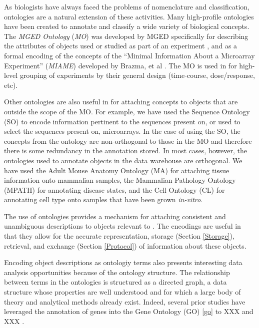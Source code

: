 As biologists have always faced the problems of nomenclature and
classification, ontologies are a natural extension of these activities.  Many
high-profile ontologies have been created to annotate and classify a wide
variety of biological concepts.  The \emph{MGED Ontology} (\emph{MO}) was
developed by MGED specifically for describing the attributes of objects used or
studied as part of an experiment \cite{XXX}, and as a formal encoding of the
concepts of the ``Minimal Information About a Microarray Experiment''
(\emph{MIAME}) developed by Brazma, et al \cite{brazma2001mim}.  The MO is used
in \dbthesis for high-level grouping of experiments by their general design
(time-course, dose/response, etc).

Other ontologies are also useful in \dbthesis for attaching concepts to objects
that are outside the scope of the MO.  For example, we have used the Sequence
Ontology (SO) \cite{so} to encode information pertinent to the sequences
present on, or used to select the sequences present on, microarrays.  In
the case of using the SO, the concepts from the ontology are non-orthogonal to
those in the MO and therefore there is some redundancy in the annotation
stored.  In most cases, however, the ontologies used to annotate objects in the
data warehouse are orthogonal.  We have used the Adult Mouse Anatomy Ontology
(MA) \cite{ma} for attaching tissue information onto mammalian samples, the
Mammalian Pathology Ontology (MPATH) \cite{mpath} for annotating disease
states, and the Cell Ontology (CL) \cite{cl} for annotating cell type onto
samples that have been grown \emph{in-vitro}.

The use of ontologies provides a mechanism for attaching consistent and
unambiguous descriptions to objects relevant to \dbthesis.  The encodings are
useful in that they allow for the accurate representation, storage (Section
\ref{Storage}), retrieval, and exchange (Section \ref{Protocol}) of information
about these objects.

Encoding object descriptions as ontologiy terms also presents interesting
data analysis opportunities because of the ontology structure.   The
relationship between terms in the ontologies is structured as a directed graph,
a data structure whose properties are well understood and for which a large
body of theory and analytical methods already exist.  Indeed, several prior
studies have leveraged the annotation of genes into the Gene Ontology (GO)
\ref{go} to XXX and XXX \cite{XXX,XXX}.


